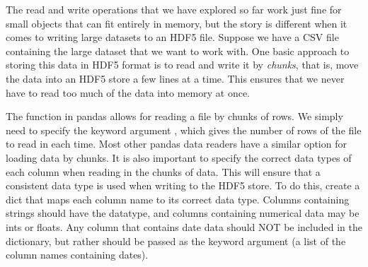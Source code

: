 The read and write operations that we have explored so far work just fine for small objects that can fit entirely in memory,
but the story is different when it comes to writing large datasets to an HDF5 file. Suppose we have a CSV file containing the
large dataset that we want to work with. One basic approach to storing this data in HDF5 format is to read and write it by 
\emph{chunks}, that is, move the data into an HDF5 store a few lines at a time. This ensures that we never have to read too much
of the data into memory at once. 

The  function in pandas allows for reading a file by chunks of rows. We simply need to specify the keyword argument
, which gives the number of rows of the file to read in each time. Most other pandas data readers have a similar
option for loading data by chunks. It is also important to specify the correct data types of each column when reading in the chunks
of data. This will ensure that a consistent data type is used when writing to the HDF5 store. To do this, create a dict that
maps each column name to its correct data type. Columns containing strings should have the  datatype, and columns
containing numerical data may be ints or floats. Any column that contains date data should NOT be included in the dictionary,
but rather should be passed as the  keyword argument (a list of the column names containing dates). 

